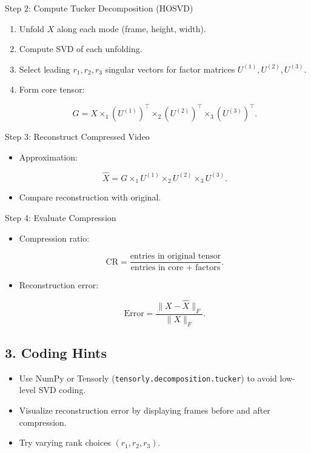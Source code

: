\documentclass[
  letterpaper,
  DIV=11,
  numbers=noendperiod]{scrreprt}
\providecommand{\tightlist}{%
  \setlength{\itemsep}{0pt}\setlength{\parskip}{0pt}}
\begin{document}
Step 2: Compute Tucker Decomposition (HOSVD)

\begin{enumerate}
\def\labelenumi{\arabic{enumi}.}
\item
  Unfold \(X\) along each mode (frame, height, width).
\item
  Compute SVD of each unfolding.
\item
  Select leading \(r_1, r_2, r_3\) singular vectors for factor matrices
  \(U^{(1)}, U^{(2)}, U^{(3)}\).
\item
  Form core tensor:

  \[
  G = X \times_1 (U^{(1)})^\top \times_2 (U^{(2)})^\top \times_3 (U^{(3)})^\top.
  \]
\end{enumerate}

Step 3: Reconstruct Compressed Video

\begin{itemize}
\item
  Approximation:

  \[
  \hat{X} = G \times_1 U^{(1)} \times_2 U^{(2)} \times_3 U^{(3)}.
  \]
\item
  Compare reconstruction with original.
\end{itemize}

Step 4: Evaluate Compression

\begin{itemize}
\item
  Compression ratio:

  \[
  \text{CR} = \frac{\text{entries in original tensor}}{\text{entries in core + factors}}.
  \]
\item
  Reconstruction error:

  \[
  \text{Error} = \frac{\|X - \hat{X}\|_F}{\|X\|_F}.
  \]
\end{itemize}

\subsection{3. Coding Hints}\label{coding-hints-1}

\begin{itemize}
\tightlist
\item
  Use NumPy or Tensorly (\texttt{tensorly.decomposition.tucker}) to
  avoid low-level SVD coding.
\item
  Visualize reconstruction error by displaying frames before and after
  compression.
\item
  Try varying rank choices \((r_1,r_2,r_3)\).
\end{itemize}
\end{document}
